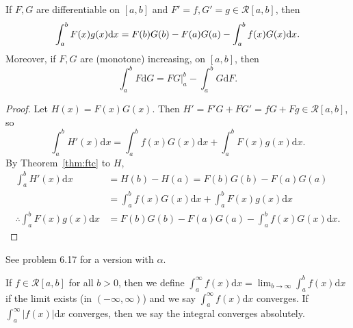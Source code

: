 \begin{thm}
	\label{thm:ibp}
	If $F,G$ are differentiable on $[a,b]$ and $F'=f,G'=g \in \mathscr{R}[a,b]$, then
	\begin{equation*}
		\int_{a}^{b}{F(x)g(x)\mathrm{d}x}=F(b)G(b)-F(a)G(a)-\int_{a}^{b}{f(x)G(x)\mathrm{d}x}\\
		.\end{equation*}
	Moreover, if $F,G$ are (monotone) increasing, on $[a,b]$, then
	\begin{equation*}
		\int_{a}^{b}{F\mathrm{d}G}=FG|_{a}^{b}-\int_{a}^{b}{G\mathrm{d}F}
		.\end{equation*}
	\begin{proof}
		Let $H(x)=F(x)G(x)$.
		Then $H'=F'G+FG'=fG + Fg \in \mathscr{R}[a,b]$, so
		\[
			\int_{a}^{b}{H'(x)\mathrm{d}x} =\int_{a}^{b}{f(x)G(x)\mathrm{d}x}+\int_{a}^{b}{F(x)g(x)\mathrm{d}x}
			.\]
		By Theorem~\ref{thm:ftc} to $H$,
		\begin{align*}
			\int_{a}^{b}{H'(x)\mathrm{d}x}               & =H(b)-H(a)=F(b)G(b)-F(a)G(a)                                         \\
			                                             & =\int_{a}^{b}{f(x)G(x)\mathrm{d}x}+\int_{a}^{b}{F(x)g(x)\mathrm{d}x} \\
			\therefore \int_{a}^{b}{F(x)g(x)\mathrm{d}x} & =F(b)G(b)-F(a)G(a)-\int_{a}^{b}{f(x)G(x)\mathrm{d}x}
			.\end{align*}
	\end{proof}

	\begin{remark}
		See problem 6.17 for a version with $\alpha$.
	\end{remark}
\end{thm}

\begin{define}
	If $f \in \mathscr{R}[a,b]$ for all $b>0$, then we define $\int_{a}^{\infty}{f(x)\mathrm{d}x}=\lim_{b\to \infty}{\int_{a}^{b}{f(x)\mathrm{d}x}}$ if the limit exists (in $(-\infty,\infty)$) and we say $\int_{a}^{\infty}{f(x)\mathrm{d}x}$ converges.
	If $\int_{a}^{\infty}{\left|f(x)\right|\mathrm{d}x}$ converges, then we say the integral converges absolutely.
\end{define}


